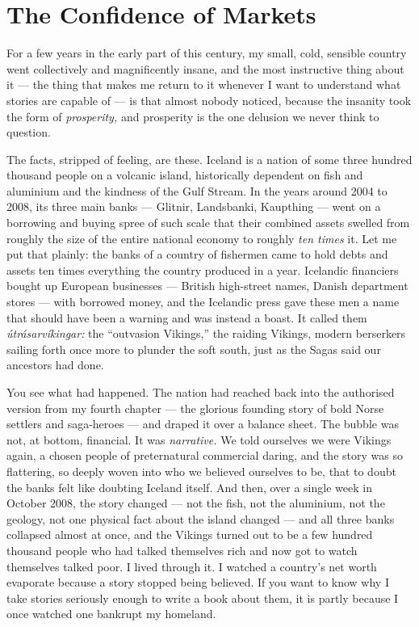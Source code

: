 \chapter{The Confidence of Markets}

For a few years in the early part of this century, my small, cold, sensible country went collectively and magnificently insane, and the most instructive thing about it — the thing that makes me return to it whenever I want to understand what stories are capable of — is that almost nobody noticed, because the insanity took the form of \emph{prosperity,} and prosperity is the one delusion we never think to question.

The facts, stripped of feeling, are these. Iceland is a nation of some three hundred thousand people on a volcanic island, historically dependent on fish and aluminium and the kindness of the Gulf Stream. In the years around 2004 to 2008, its three main banks — Glitnir, Landsbanki, Kaupthing — went on a borrowing and buying spree of such scale that their combined assets swelled from roughly the size of the entire national economy to roughly \emph{ten times} it. Let me put that plainly: the banks of a country of fishermen came to hold debts and assets ten times everything the country produced in a year. Icelandic financiers bought up European businesses — British high-street names, Danish department stores — with borrowed money, and the Icelandic press gave these men a name that should have been a warning and was instead a boast. It called them \emph{útrásarvíkingar:} the ``outvasion Vikings,'' the raiding Vikings, modern berserkers sailing forth once more to plunder the soft south, just as the Sagas said our ancestors had done.

You see what had happened. The nation had reached back into the authorised version from my fourth chapter — the glorious founding story of bold Norse settlers and saga-heroes — and draped it over a balance sheet. The bubble was not, at bottom, financial. It was \emph{narrative.} We told ourselves we were Vikings again, a chosen people of preternatural commercial daring, and the story was so flattering, so deeply woven into who we believed ourselves to be, that to doubt the banks felt like doubting Iceland itself. And then, over a single week in October 2008, the story changed — not the fish, not the aluminium, not the geology, not one physical fact about the island changed — and all three banks collapsed almost at once, and the Vikings turned out to be a few hundred thousand people who had talked themselves rich and now got to watch themselves talked poor. I lived through it. I watched a country's net worth evaporate because a story stopped being believed. If you want to know why I take stories seriously enough to write a book about them, it is partly because I once watched one bankrupt my homeland.


